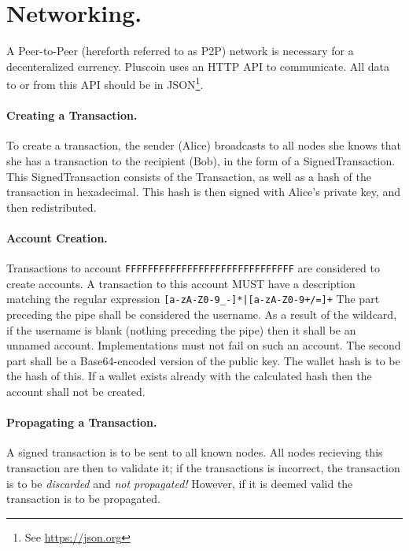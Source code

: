 \documentclass{article}
\begin{document}
\label{net}
\section{Networking.}
A Peer-to-Peer (hereforth referred to as P2P) network is necessary for a
decenteralized currency. Pluscoin uses an HTTP API to communicate. All data to
or from this API should be in JSON\footnote{See \url{https://json.org}}.

\paragraph{Creating a Transaction.} To create a transaction, the sender (Alice)
broadcasts to all nodes she knows that she has a transaction to the recipient
(Bob), in the form of a SignedTransaction. This SignedTransaction consists of
the Transaction, as well as a hash of the transaction in hexadecimal. This hash is
then signed with Alice's private key, and then redistributed.

\paragraph{Account Creation.} Transactions to account
{\texttt{F\-F\-F\-F\-F\-F\-F\-F\-F\-F\-F\-F\-F\-F\-F\-F\-F\-F\-F\-F\-F\-F\-F\-F\-F\-F\-F\-F\-F\-F}}
are considered to create accounts. A transaction to this account MUST have a
description matching the regular expression \verb~[a-zA-Z0-9_-]*|[a-zA-Z0-9+/=]+~
The part preceding the pipe shall be considered the username. As a result of
the wildcard, if the username is blank (nothing preceding the pipe) then it
shall be an unnamed account. Implementations must not fail on such an account.
The second part shall be a Base64-encoded version of the public key. The
wallet hash is to be the hash of this. If a wallet exists already with the
calculated hash then the account shall not be created.

\label{prop}
\paragraph{Propagating a Transaction.} A signed transaction is to be sent to all
known nodes. All nodes recieving this transaction are then to validate
it; if the transactions is incorrect, the transaction is to be {\it{discarded}}
and {\it{not propagated!}} However, if it is deemed valid the transaction is to
be propagated.
\end{document}
